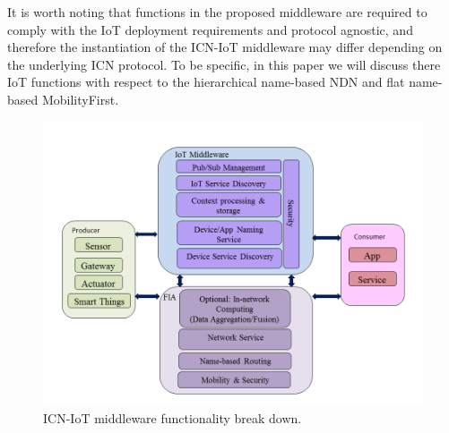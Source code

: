 It is worth noting that functions in the proposed middleware are required to comply with the IoT deployment requirements and protocol agnostic, and therefore the instantiation of the ICN-IoT middleware may differ depending on the underlying ICN protocol. To be specific, in this paper we will discuss there IoT functions with respect to the hierarchical name-based NDN and flat name-based MobilityFirst.
\begin{figure}
\centering
\includegraphics[width=\columnwidth]{figure/middleware_architecture.png}
\caption{\label{fig:mid_arch} ICN-IoT middleware functionality break down.}
\end{figure}
